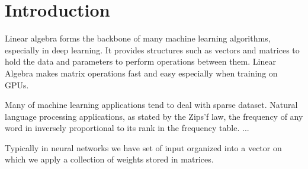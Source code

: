 \chapter*{Introduction}


Linear algebra forms the backbone of many machine learning algorithms, especially in deep learning. It provides structures such as vectors and matrices to hold the data and parameters to perform operations between them. Linear Algebra makes matrix operations fast and easy especially when training on GPUs.

Many of machine learning applications tend to deal with sparse dataset. Natural language processing applications, as stated by the Zips'f law, the frequency of any word in inversely proportional to its rank in the frequency table. ...

Typically in neural networks we have set of input organized into a vector on which we apply a collection of weights stored in matrices.  



